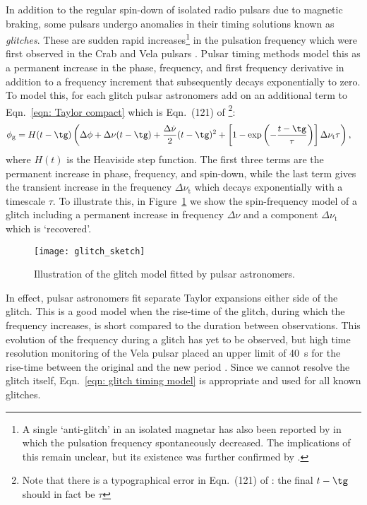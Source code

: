 In addition to the regular spin-down of isolated radio pulsars due to magnetic
braking,
some pulsars undergo anomalies in their timing solutions known as
\emph{glitches}.  These are sudden rapid increases\footnote{A single `anti-glitch'
in an isolated magnetar has also been reported by \citet{archibald2013anti} in
which the pulsation frequency spontaneously decreased. The implications of this
remain unclear, but its existence was further confirmed by \citet{hu2014glitch}.}
 in the pulsation frequency
which were first observed in the Crab \citep{Boynton1969, Richards1969} and
Vela pulsars \citep{RadhakrishnanManchester1969, Reichley1969}. Pulsar
timing methods model this as a permanent increase in the phase, frequency, and
first frequency derivative in addition to a frequency increment that
subsequently decays exponentially to zero.  To model this,
for each glitch pulsar astronomers add on an additional term to
Eqn.~\eqref{eqn: Taylor compact} which is
Eqn.~(121) of \citet{Edwards2006}\footnote{Note that there is a typographical
error in Eqn.~(121) of \citet{Edwards2006}: the final $t-\tg$ should in fact
be $\tau$}:
\begin{align}
\begin{split}
\phi_{\textrm{g}} = H(t - \tg)& {}\left(
\Delta\phi + \Delta\nu(t - \tg) + \frac{\Delta\dot{\nu}}{2}(t - \tg)^{2}
+ \left[1-\exp\left(-\frac{t - \tg}{\tau}\right)\right]
\Delta\nu_{\textrm{t}}\tau
\right),
\end{split}
\label{eqn: glitch timing model}
\end{align}
where $H(t)$ is the Heaviside step function. The first
three terms are the permanent increase in phase, frequency, and spin-down,
while the last term gives the transient increase in the frequency
$\Delta\nu_{\textrm{t}}$ which decays exponentially with a timescale $\tau$.
To illustrate this, in Figure~\ref{fig: glitch sketch} we show the spin-frequency
model of a glitch including a permanent increase in frequency $\Delta\nu$ and
a component $\Delta\nu_{\textrm{t}}$ which is `recovered'.
\begin{figure}[htb]
\centering
\texttt{[image: glitch\_sketch]}
\caption{Illustration of the glitch model fitted by pulsar astronomers.}
\label{fig: glitch sketch}
\end{figure}

In effect, pulsar astronomers fit separate Taylor expansions either side of the
glitch. This is a good model when the rise-time of the glitch, during which the
frequency increases, is short compared to the duration between observations.
This evolution of the frequency during a glitch has yet to be observed, but
high time resolution monitoring of the Vela pulsar placed an upper limit of
40~s for the rise-time between the original and the new period
\citep{dodson2001}. Since we cannot resolve the glitch itself,
Eqn.~\eqref{eqn: glitch timing model} is appropriate and used for all known
glitches.

